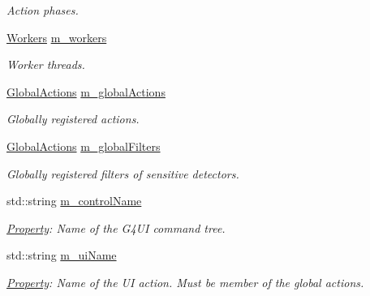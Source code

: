 \begin{DoxyCompactItemize}
\begin{DoxyCompactList}\small\item\em Action phases. \item\end{DoxyCompactList}\item 
\hyperlink{class_d_d4hep_1_1_simulation_1_1_geant4_kernel_ae9fdf26cda88a6f822f060558e85d797}{Workers} \hyperlink{class_d_d4hep_1_1_simulation_1_1_geant4_kernel_a8957db5b08d92dcd7b7c4ef63ea743b6}{m\_\-workers}
\begin{DoxyCompactList}\small\item\em Worker threads. \item\end{DoxyCompactList}\item 
\hyperlink{class_d_d4hep_1_1_simulation_1_1_geant4_kernel_a9cd070dfd06f049aa11b56688faaa643}{GlobalActions} \hyperlink{class_d_d4hep_1_1_simulation_1_1_geant4_kernel_a23bac03e5a169b5fc9446e574ad034ac}{m\_\-globalActions}
\begin{DoxyCompactList}\small\item\em Globally registered actions. \item\end{DoxyCompactList}\item 
\hyperlink{class_d_d4hep_1_1_simulation_1_1_geant4_kernel_a9cd070dfd06f049aa11b56688faaa643}{GlobalActions} \hyperlink{class_d_d4hep_1_1_simulation_1_1_geant4_kernel_afab7f53720ce6b7255ff54d777c4ff4e}{m\_\-globalFilters}
\begin{DoxyCompactList}\small\item\em Globally registered filters of sensitive detectors. \item\end{DoxyCompactList}\item 
std::string \hyperlink{class_d_d4hep_1_1_simulation_1_1_geant4_kernel_a1019ec87b302f798f36361dd9be8b40a}{m\_\-controlName}
\begin{DoxyCompactList}\small\item\em \hyperlink{class_d_d4hep_1_1_property}{Property}: Name of the G4UI command tree. \item\end{DoxyCompactList}\item 
std::string \hyperlink{class_d_d4hep_1_1_simulation_1_1_geant4_kernel_aea869c039be9e0818e4f80afbab1e47c}{m\_\-uiName}
\begin{DoxyCompactList}\small\item\em \hyperlink{class_d_d4hep_1_1_property}{Property}: Name of the UI action. Must be member of the global actions. \item\end{DoxyCompactList}\item 

\end{DoxyCompactItemize}

